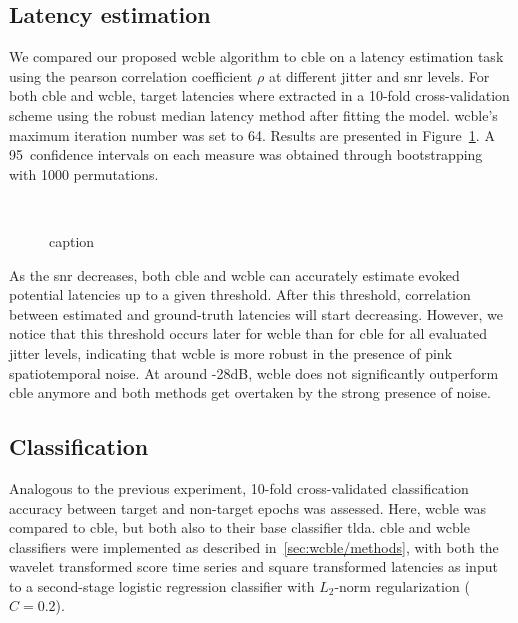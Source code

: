 \subsection{Latency estimation}
We compared our proposed \ac{wcble} algorithm to \ac{cble} on a latency
estimation task using the pearson correlation coefficient $\rho$ at different
jitter and \ac{snr} levels.
For both \ac{cble} and \ac{wcble}, target latencies where extracted in a
10-fold cross-validation scheme using the robust median latency method after
fitting the model.
\Ac{wcble}'s maximum iteration number was set to 64.
Results are presented in Figure~\ref{fig:wcble/results/latency}.
A 95\ confidence intervals on each measure was obtained through bootstrapping
with 1000 permutations.

\begin{figure}[!ht]
   \\
  
  \caption{caption}
  \label{fig:wcble/results/latency}
\end{figure}

As the \ac{snr} decreases, both \ac{cble} and \ac{wcble} can accurately
estimate evoked potential latencies up to a given threshold. After this
threshold, correlation between estimated and ground-truth latencies will start
decreasing.
However, we notice that this threshold occurs later for \ac{wcble} than for
\ac{cble} for all evaluated jitter levels, indicating that \ac{wcble} is more
robust in the presence of pink spatiotemporal noise.
At around -28dB, \ac{wcble} does not significantly outperform \ac{cble}
anymore and both methods get overtaken by the strong presence of noise.


\subsection{Classification}
Analogous to the previous experiment, 10-fold cross-validated classification
accuracy between target and non-target epochs was assessed.
Here, \ac{wcble} was compared to \ac{cble}, but both also to their base classifier
\ac{tlda}.
\Ac{cble} and \ac{wcble} classifiers were implemented as described
in~\ref{sec:wcble/methods}, with both the wavelet transformed score time series
and square transformed latencies as input to a second-stage logistic regression
classifier with $L_2$-norm regularization ($C=0.2$).


